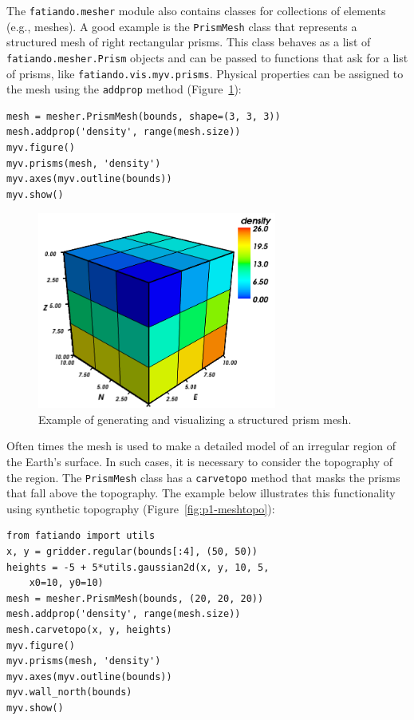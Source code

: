 The \texttt{fatiando.mesher} module also contains classes for
collections of elements (e.g., meshes). A good example is the
\texttt{PrismMesh} class that represents a structured mesh of right
rectangular prisms. This class behaves as a list of
\texttt{fatiando.mesher.Prism} objects and can be passed to functions
that ask for a list of prisms, like \texttt{fatiando.vis.myv.prisms}.
Physical properties can be assigned to the mesh using the
\texttt{addprop} method (Figure~\ref{fig:p1-mesh}):

\begin{verbatim}
mesh = mesher.PrismMesh(bounds, shape=(3, 3, 3))
mesh.addprop('density', range(mesh.size))
myv.figure()
myv.prisms(mesh, 'density')
myv.axes(myv.outline(bounds))
myv.show()
\end{verbatim}

\begin{figure}
    \centering
    \includegraphics[width=0.7\textwidth]{figures/paper-fatiando/meshes_3dplotting_mesh}
    \caption{
        Example of generating and visualizing a structured prism mesh.
    }
    \label{fig:p1-mesh}
\end{figure}

Often times the mesh is used to make a detailed model of an irregular
region of the Earth's surface. In such cases, it is necessary to
consider the topography of the region. The \texttt{PrismMesh} class has
a \texttt{carvetopo} method that masks the prisms that fall above the
topography. The example below illustrates this functionality using
synthetic topography (Figure~\ref{fig:p1-meshtopo}):

\begin{verbatim}
from fatiando import utils
x, y = gridder.regular(bounds[:4], (50, 50))
heights = -5 + 5*utils.gaussian2d(x, y, 10, 5,
    x0=10, y0=10)
mesh = mesher.PrismMesh(bounds, (20, 20, 20))
mesh.addprop('density', range(mesh.size))
mesh.carvetopo(x, y, heights)
myv.figure()
myv.prisms(mesh, 'density')
myv.axes(myv.outline(bounds))
myv.wall_north(bounds)
myv.show()
\end{verbatim}

